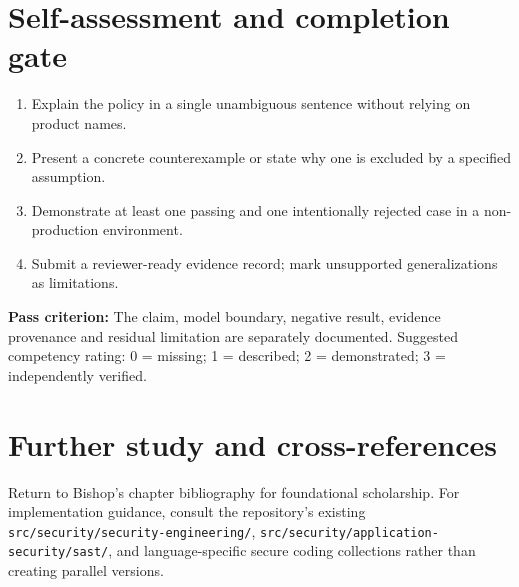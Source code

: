 \documentclass[10pt,letterpaper]{article}
\begin{document}
\section{Self-assessment and completion gate}
\begin{enumerate}
\item Explain the policy in a single unambiguous sentence without relying on product names.
\item Present a concrete counterexample or state why one is excluded by a specified assumption.
\item Demonstrate at least one passing and one intentionally rejected case in a non-production environment.
\item Submit a reviewer-ready evidence record; mark unsupported generalizations as limitations.
\end{enumerate}
\textbf{Pass criterion:} The claim, model boundary, negative result, evidence provenance and residual limitation are separately documented. Suggested competency rating: 0 = missing; 1 = described; 2 = demonstrated; 3 = independently verified.
\section{Further study and cross-references}
Return to Bishop's chapter bibliography for foundational scholarship. For implementation guidance, consult the repository's existing \nolinkurl{src/security/security-engineering/}, \nolinkurl{src/security/application-security/sast/}, and language-specific secure coding collections rather than creating parallel versions.
\end{document}
